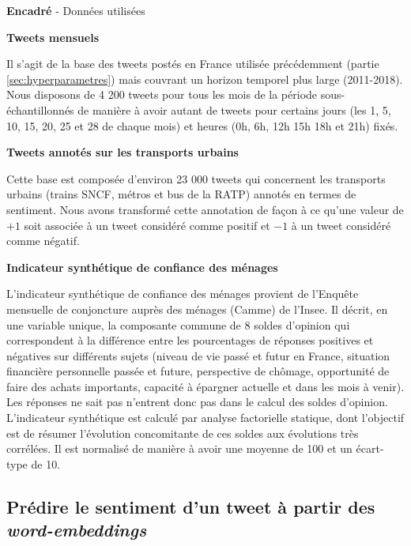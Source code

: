 \documentclass[11pt,french,french]{article}
\newcounter{comptEncadre}
\renewcommand\thecomptEncadre{%
\arabic{comptEncadre}}
\newenvironment{encadre}[2][false]{\refstepcounter{comptEncadre}
\begin{bclogo}[couleur=processblue!5,arrondi=0.1,
logo=\bcloupe,barre=none,couleurBord=blue!60!green,nobreak = #1]{ {\sc \textbf{Encadré \thecomptEncadre}} -  #2}
\smallskip
}{\end{bclogo}}
\begin{document}
\begin{encadre}[true]{Données utilisées}\label{enc:encadre1}

\small

\textbf{Tweets mensuels}

Il s'agit de la base des tweets postés en France utilisée précédemment (partie  \ref{sec:hyperparametres}) mais couvrant un horizon temporel plus large (2011-2018).
Nous disposons de 4 200 tweets pour tous les mois de la période sous-échantillonnés de manière à avoir autant de tweets pour certains jours (les 1, 5, 10, 15, 20, 25 et 28 de chaque mois) et heures (0h, 6h, 12h 15h 18h et 21h) fixés. 

\textbf{Tweets annotés sur les transports urbains}

Cette base est composée d'environ 23 000 tweets qui concernent les transports urbains (trains SNCF, métros et bus de la RATP) annotés en termes de sentiment.
Nous avons transformé cette annotation de façon à ce qu'une valeur de $+1$ soit associée à un tweet considéré comme positif et $-1$ à un tweet considéré comme négatif.


\textbf{Indicateur synthétique de confiance des ménages}

L’indicateur synthétique de confiance des ménages provient de l'Enquête mensuelle de conjoncture auprès des ménages (Camme) de l’Insee.
Il décrit, en une variable unique, la composante commune de 8 soldes d’opinion qui correspondent à la différence entre les pourcentages de réponses positives et négatives sur différents sujets (niveau de vie passé et futur en France, situation financière personnelle passée et future, perspective de chômage, opportunité de faire des achats importants, capacité à épargner actuelle et dans les mois à venir). Les réponses \og ne sait pas \fg n'entrent donc pas dans le calcul des soldes d'opinion.
L'indicateur synthétique est calculé par analyse factorielle statique, dont l’objectif est de résumer l’évolution concomitante de ces soldes aux évolutions très corrélées.
Il est normalisé de manière à avoir une moyenne de 100 et un écart-type de 10. 

\end{encadre}

\hypertarget{pruxe9dire-le-sentiment-dun-tweet-uxe0-partir-des-word-embeddings}{%
\subsection{\texorpdfstring{Prédire le sentiment d'un tweet à partir des \emph{word-embeddings}}{Prédire le sentiment d'un tweet à partir des word-embeddings}}\label{pruxe9dire-le-sentiment-dun-tweet-uxe0-partir-des-word-embeddings}}
\end{document}
